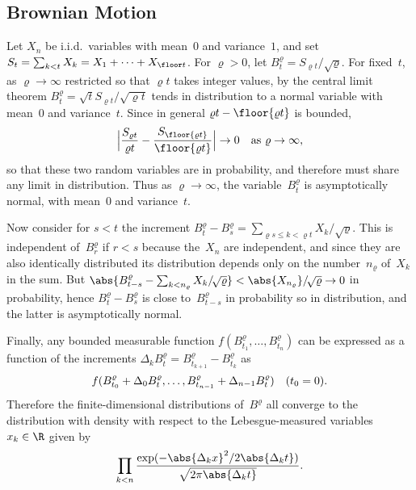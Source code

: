 \subsection	{Brownian Motion}

Let $X_n$ be i.i.d.~variables with mean~$0$ and variance~$1$,
and set \( S_t = \sum_{k<t} X_k = X_1 +\dots+ X_{\floor t} \).
For \( \varrho > 0 \), let \( B^\varrho_t = S_{\varrho t}/\!\sqrt\varrho \).
For fixed~$t$, as \( \varrho \to \infty \)
restricted so that $\varrho t$ takes integer values,
by the central limit theorem
\( B^\varrho_t = \sqrt t S_{\varrho t}/\!\sqrt{\varrho t} \)
tends in distribution to a normal variable with mean~$0$ and variance~$t$.
Since in general \( \varrho t - \floor{\varrho t} \) is bounded,
\[
	\Bigl\lvert \frac {S_{\varrho t}} {\varrho t}
		- \frac {S_{\floor{\varrho t}}} {\floor{\varrho t}}
	\Bigr\rvert
	\to 0 \quad \text{as \(\varrho \to \infty\),}
\] so that
these two random variables are  in probability,
and therefore must share any limit in distribution.
Thus as \( \varrho \to \infty \),
the variable~$B^\varrho_t$ is asymptotically normal,
with mean~$0$ and variance~$t$.

Now consider for \( s < t \) the increment
\( B^\varrho_t - B^\varrho_s =
	\sum_{\varrho s \le k < \varrho t} X_k/\!\sqrt\varrho \).
This is independent of~$B^\varrho_r$ if \( r < s \)
because the~$X_n$ are independent,
and since they are also identically distributed
its distribution depends only on the number~$n_\varrho$ of~$X_k$ in the sum.
But \( \abs{B^\varrho_{t-s} - \sum_{k<n_\varrho} X_k/\!\sqrt\varrho}
	< \abs{X_{n_\varrho}}/\!\sqrt\varrho \to 0 \)
in probability,
hence \( B^\varrho_t - B^\varrho_s \) is close to~$B^\varrho_{t-s}$
in probability so in distribution,
and the latter is asymptotically normal.

Finally, any bounded measurable function
\( f(B^\varrho_{t_1},\dots,B^\varrho_{t_n}) \)
can be expressed as a function of the increments
\( \Delta_k B^\varrho_t = B^\varrho_{t_{k+1}} - B^\varrho_{t_k} \)
as \[
	f(B^\varrho_{t_0}+\Delta_0 B^\varrho_t, \dots,
		B^\varrho_{t_{n-1}}+\Delta_{n-1}B^\varrho_t)
	\quad \text{(\( t_0 = 0 \)).}
\]  Therefore the finite-dimensional distributions of~$B^\varrho$
all converge to the distribution with density with respect to the
Lebesgue-measured variables \( x_k \in \R \) given by \[
	\prod_{k<n} \frac {\exp(-\abs{\Delta_k x}^2/2\abs{\Delta_k t})}
		                     {\sqrt{2\pi\abs{\Delta_k t}}}
	\text.
\]
